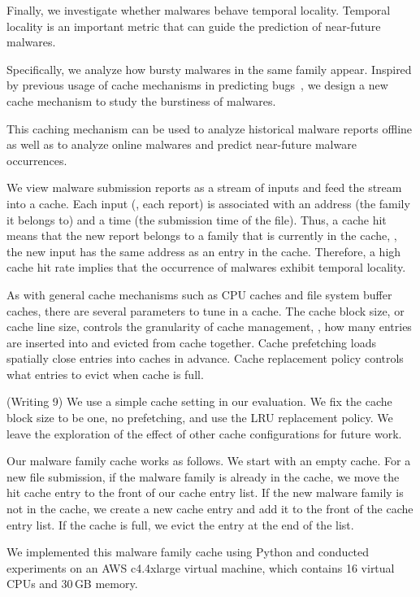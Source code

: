 Finally, we investigate whether malwares behave temporal locality.
Temporal locality is an important metric that can guide the 
prediction of near-future malwares.

Specifically, we analyze how bursty malwares in the same family appear.  
Inspired by previous usage of cache mechanisms in predicting bugs~\cite{predicting},
we design a new cache mechanism to study the burstiness of malwares.

This caching mechanism can be used to analyze historical malware reports offline 
as well as to analyze online malwares and predict near-future malware occurrences.

We view malware submission reports as a stream of inputs 
and feed the stream into a cache. 
Each input (\ie, each report) is associated with an address (the family it belongs to) and a time (the submission time of the file).
Thus, a cache hit means that the new report belongs to a family that is currently in the cache,
\ie, the new input has the same address as an entry in the cache.
Therefore, a high cache hit rate implies that the occurrence of malwares exhibit temporal locality.

As with general cache mechanisms such as CPU caches and file system buffer caches, 
there are several parameters to tune in a cache.
The cache block size, or cache line size, controls the granularity of cache management, 
\ie, how many entries are inserted into and evicted from cache together.
Cache prefetching loads spatially close entries into caches in advance. 
Cache replacement policy controls what entries to evict when cache is full.
{\color{red} (Writing 9)
We use a simple cache setting in our evaluation. 
We fix the cache block size to be one, no prefetching, 
and use the LRU replacement policy.
We leave the exploration of the effect of other cache configurations for future work. 

Our malware family cache works as follows.
We start with an empty cache. 
For a new file submission, if the malware family is already in the cache, 
we move the hit cache entry to the front of our cache entry list. 
If the new malware family is not in the cache, 
we create a new cache entry and add it to the front of the cache entry list.
If the cache is full, we evict the entry at the end of the list. 
}


We implemented this malware family cache using Python
and conducted experiments on an AWS c4.4xlarge virtual machine, 
which contains 16 virtual CPUs and 30\,GB memory.

